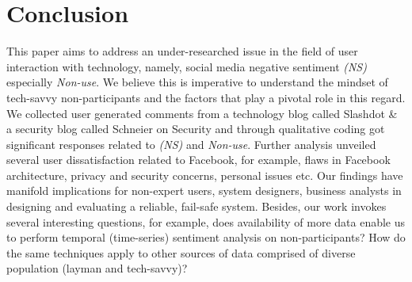 \section{Conclusion}
\label{sec:conclusion}
This paper aims to address an under-researched issue in the field of user interaction with technology, namely, social media negative sentiment \emph{(NS)} especially \textit{Non-use}. We believe this is imperative to understand the mindset of tech-savvy non-participants and the factors that play a pivotal role in this regard. We collected user generated comments from a technology blog called Slashdot \& a security blog called Schneier on Security and through qualitative coding got significant responses related to \emph{(NS)} and \textit{Non-use}. Further analysis unveiled several user dissatisfaction related to Facebook, for example, flaws in Facebook architecture, privacy and security concerns, personal issues etc. Our findings have manifold implications for non-expert users, system designers, business analysts in designing and evaluating a reliable, fail-safe system. Besides, our work invokes several interesting questions, for example, does availability of more data enable us to perform temporal (time-series) sentiment analysis on non-participants? How do the same techniques apply to other sources of data comprised of diverse population (layman and tech-savvy)? 